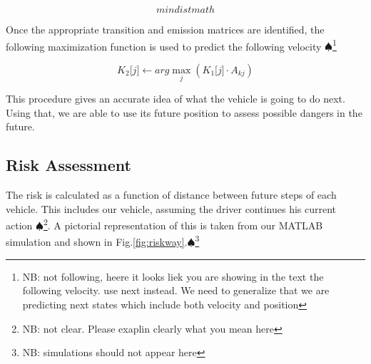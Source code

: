\documentclass[conference]{IEEEtran}
\newcommand\NB[1]{$\spadesuit$\footnote{NB: #1}}
\begin{document}
\begin{equation}
    min dist math
\end{equation}

Once the appropriate transition and emission matrices are identified, the following maximization function is used to predict the following velocity \NB{not following, heere it looks liek you are showing in the text the following velocity. use next instead. We need to generalize that we are predicting next states which include both velocity and position}

\begin{equation}
     K_{2}\lbrack j \rbrack \gets arg \max\limits_{j}(K_{1} \lbrack j \rbrack \cdot A_{kj})
\end{equation}

This procedure gives an accurate idea of what the vehicle is going to do next. Using that, we are able to use its future position to assess possible dangers in the future.

\subsection{Risk Assessment}

The risk is calculated as a function of distance between future steps of each vehicle. This includes our vehicle, assuming the driver continues his current action \NB{not clear. Please exaplin clearly what you mean here}. A pictorial representation of this is taken from our MATLAB simulation and shown in Fig.\ref{fig:riskway}.\NB{simulations should not appear here}
\end{document}
